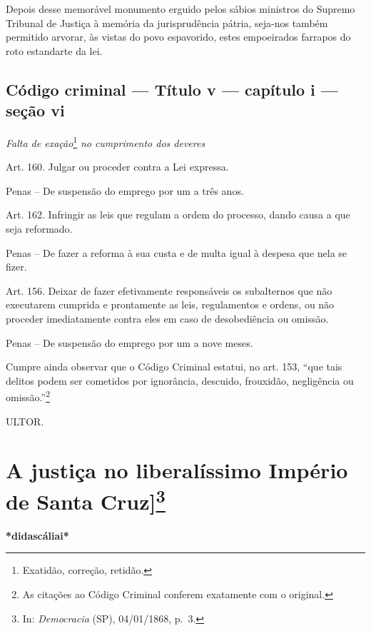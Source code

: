 Depois desse memorável monumento erguido pelos sábios ministros do
Supremo Tribunal de Justiça à memória da jurisprudência pátria, seja-nos
também permitido arvorar, às vistas do povo espavorido, estes
empoeirados farrapos do roto estandarte da lei.

\section{Código criminal --- Título v --- capítulo i --- seção vi}

\emph{Falta de exação}\footnote{Exatidão, correção, retidão.} \emph{no
cumprimento dos deveres}

Art. 160. Julgar ou proceder contra a Lei expressa.

Penas -- De suspensão do emprego por um a três anos.

Art. 162. Infringir as leis que regulam a ordem do processo, dando causa
a que seja reformado.

Penas -- De fazer a reforma à sua custa e de multa igual à despesa que
nela se fizer.

Art. 156. Deixar de fazer efetivamente responsáveis os subalternos que
não executarem cumprida e prontamente as leis, regulamentos e ordens, ou
não proceder imediatamente contra eles em caso de desobediência ou
omissão.

Penas -- De suspensão do emprego por um a nove meses.

Cumpre ainda observar que o Código Criminal estatui, no art. 153, ``que
tais delitos podem ser cometidos por ignorância, descuido, frouxidão,
negligência ou omissão.''\footnote{As citações ao Código Criminal
  conferem exatamente com o original.}

ULTOR.

\chapter{A justiça no liberalíssimo Império de Santa
Cruz]\footnote{In: \emph{Democracia} (SP), 04/01/1868, p.~3.}}

\textbf{*didascáliai*}

